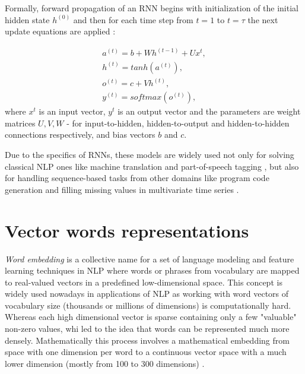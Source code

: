 Formally, forward propagation of an RNN begins with initialization of the initial hidden state $h^{(0)}$ and then for each time step from $t=1$ to $t=\tau$ the next update equations are applied \citep{Goodfellow-2016}:

\begin{equation}\label{eq:rnn}
\begin{gathered} 
    a^{(t)} = b+Wh^{(t-1)}+Ux^{t}, \\
    h^{(t)} = tanh(a^{(t)}), \\
    o^{(t)} = c+Vh^{(t)}, \\
    y^{(t)} = softmax(o^{(t)}),
\end{gathered}
\end{equation}
where $x^{t}$ is an input vector, $y^{t}$ is an output vector and the parameters are weight matrices $U, V, W$ - for input-to-hidden, hidden-to-output and hidden-to-hidden connections respectively, and bias vectors $b$ and $c$.

Due to the specifics of RNNs, these models are widely used not only for solving classical NLP ones like machine translation \citep{Chen-2018} and part-of-speech tagging \citep{Plank-2016}, but also for handling sequence-based tasks from other domains like program code generation \citep{Stehnii-2017} and filling missing values in multivariate time series \citep{Che-2016}.

\section{Vector words representations}

\textit{Word embedding} is a collective name for a set of language modeling and feature learning techniques in NLP where words or phrases from vocabulary are mapped to real-valued vectors in a predefined low-dimensional space. This concept is widely used nowadays in applications of NLP as working with word vectors of vocabulary size (thousands or millions of dimensions) is computationally hard. Whereas each high dimensional vector is sparse containing only a few "valuable" non-zero values, whi led to the idea that words can be represented much more densely. Mathematically this process involves a mathematical embedding from space with one dimension per word to a continuous vector space with a much lower dimension (mostly from 100 to 300 dimensions) \citep{Brownlee-2017}.

